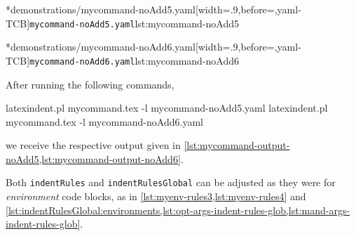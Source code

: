 	\begin{minipage}{.45\textwidth}
		\cmhlistingsfromfile[style=yaml-LST]*{demonstrations/mycommand-noAdd5.yaml}[width=.9\linewidth,before=\centering,yaml-TCB]{\texttt{mycommand-noAdd5.yaml}}{lst:mycommand-noAdd5}
	\end{minipage}
	\hfill
	\begin{minipage}{.45\textwidth}
		\cmhlistingsfromfile[style=yaml-LST]*{demonstrations/mycommand-noAdd6.yaml}[width=.9\linewidth,before=\centering,yaml-TCB]{\texttt{mycommand-noAdd6.yaml}}{lst:mycommand-noAdd6}
	\end{minipage}

	After running the following commands,
	\begin{commandshell}
latexindent.pl mycommand.tex -l mycommand-noAdd5.yaml  
latexindent.pl mycommand.tex -l mycommand-noAdd6.yaml  
\end{commandshell}
	we receive the respective output given in \cref{lst:mycommand-output-noAdd5,lst:mycommand-output-noAdd6}.

	\begin{minipage}{.45\textwidth}
	\end{minipage}
	\hfill
	\begin{minipage}{.45\textwidth}
	\end{minipage}

	Both \texttt{indentRules} and \texttt{indentRulesGlobal} can be adjusted as they were for
	\emph{environment} code blocks, as in \vref{lst:myenv-rules3,lst:myenv-rules4} and
	\vref{lst:indentRulesGlobal:environments,lst:opt-args-indent-rules-glob,lst:mand-args-indent-rules-glob}.
